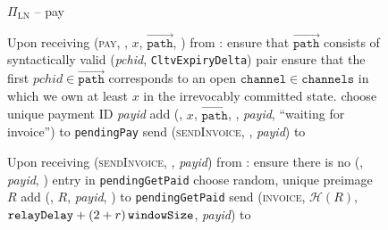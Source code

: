   \begin{figure}[H]
    \begin{protocolbox}{$\Pi_{\mathrm{LN}}$ -- pay}
      \begin{algorithmic}[1]
        \State Upon receiving (\textsc{pay}, \bob, $x$,
        $\overrightarrow{\mathtt{path}}$, ) from
        \environment:
        \Indent
          \State ensure that $\overrightarrow{\mathtt{path}}$ consists of
          syntactically valid (\textit{pchid}, \texttt{CltvExpiryDelta}) pair
          \label{alg:protocol:pay:validpath}
          \State ensure that the first $\mathit{pchid} \in
          \overrightarrow{\mathtt{path}}$ corresponds to an open
          $\mathtt{channel} \in \mathtt{channels}$ in which we own at least $x$
          in the irrevocably committed state.
          \label{alg:protocol:pay:validchannel}
          \State choose unique payment ID \textit{payid} 
          \State add (\bob, $x$, $\overrightarrow{\mathtt{path}}$,
          , \textit{payid}, ``waiting for invoice'') to
          \texttt{pendingPay}
          \State send (\textsc{sendInvoice}, ,
          \textit{payid}) to \bob{}
          \label{alg:protocol:pay:sendinvoice}
        \EndIndent
        \Statex

        \State Upon receiving (\textsc{sendInvoice}, , \textit{payid}) from \bob:
        \label{alg:protocol:pay:sendinvoice:receive}
        \Indent
          \State ensure there is no (\bob, 
          \textit{payid}, \redden{\_}) entry in \texttt{pendingGetPaid}
          \State choose random, unique preimage $R$
          \State add (\bob, $R$,  \textit{payid},
          ) to \texttt{pendingGetPaid}
          \State send (\textsc{invoice}, $\mathcal{H}(R)$, $\mathtt{relayDelay}
          + \left(2 + r\right)\texttt{windowSize}{}$, \textit{payid}) to \bob{}
        \EndIndent
      \end{algorithmic}
    \end{protocolbox}
    \caption{}
    \label{alg:protocol:pay:outofband}
  \end{figure}

